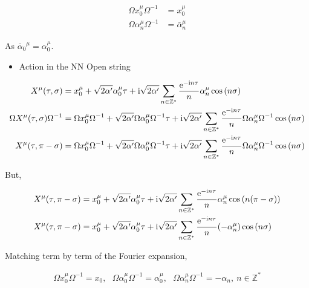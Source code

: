 \begin{align*}
    \Omega x_0^\mu \Omega^{-1}&=x_0^\mu\\
    \Omega \alpha_n^\mu \Omega^{-1}&={\bar\alpha}_n^\mu
\end{align*}

As ${\bar \alpha_0}^\mu=\alpha_0^\mu$.

\begin{itemize}
    \item Action in the NN Open string
\end{itemize}
\begin{align*}
    X^{\mu}\qty(\tau,\sigma)&=x^\mu_0+\sqrt{2\alpha'}\alpha^\mu_0\tau+\textnormal{i} \sqrt{2\alpha'}\sum\limits_{n\in\mathbb Z^\ast}\frac{\textnormal{e}^{-\textnormal{i} n\tau}}{n}{\alpha}^\mu_n\cos\qty( n\sigma)\\
    \Omega X ^{\mu}\qty(\tau,\sigma)\Omega^{-1}&=\Omega x^\mu_0\Omega^{-1}+\sqrt{2\alpha'}\Omega\alpha^\mu_0\Omega^{-1}\tau+\textnormal{i} \sqrt{2\alpha'}\sum\limits_{n\in\mathbb Z^\ast}\frac{\textnormal{e}^{-\textnormal{i} n\tau}}{n}\Omega{\alpha}^\mu_n\Omega^{-1}\cos\qty( n\sigma)\\
    X^{\mu}\qty(\tau,\pi-\sigma)&=\Omega x^\mu_0\Omega^{-1}+\sqrt{2\alpha'}\Omega\alpha^\mu_0\Omega^{-1}\tau+\textnormal{i} \sqrt{2\alpha'}\sum\limits_{n\in\mathbb Z^\ast}\frac{\textnormal{e}^{-\textnormal{i} n\tau}}{n}\Omega{\alpha}^\mu_n\Omega^{-1}\cos\qty( n\sigma)
\end{align*}

But,

\begin{align*}
    X^{\mu}\qty(\tau,\pi-\sigma)&=x^\mu_0+\sqrt{2\alpha'}\alpha^\mu_0\tau+\textnormal{i} \sqrt{2\alpha'}\sum\limits_{n\in\mathbb Z^\ast}\frac{\textnormal{e}^{-\textnormal{i} n\tau}}{n}{\alpha}^\mu_n\cos\qty( n\qty(\pi-\sigma))\\
    X^{\mu}\qty(\tau,\pi-\sigma)&=x^\mu_0+\sqrt{2\alpha'}\alpha^\mu_0\tau+\textnormal{i} \sqrt{2\alpha'}\sum\limits_{n\in\mathbb Z^\ast}\frac{\textnormal{e}^{-\textnormal{i} n\tau}}{n}\qty(-{\alpha}^\mu_n)\cos\qty( n\sigma)
\end{align*}

Matching term by term of the Fourier expansion,

\begin{align*}
    \Omega x_0^\mu\Omega^{-1}=x_0,\ \ \ \Omega\alpha_0^\mu\Omega^{-1}=\alpha_0^\mu,\ \ \ \Omega \alpha_n^\mu\Omega^{-1}=-\alpha_n,\ n\in\mathbb Z^\ast
\end{align*}

